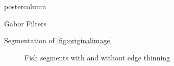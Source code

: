 \documentclass[final]{beamer}
\begin{document}
\begin{frame}
\begin{columns}
\begin{column}{.33\textwidth}
\begin{beamercolorbox}[center,wd=\textwidth]{postercolumn}
\begin{minipage}[T]{.95\textwidth}
{\begin{block}{Gabor Filters}
            \end{block}
            \vfill
            \begin{block}{Segmentation of \ref{fig:originalimage}}
             \begin{figure}
               \centering
               \caption{Fish segments with and without edge thinning}
               

\end{figure}
\end{block}}
\end{minipage}
\end{beamercolorbox}
\end{column}
\end{columns}
\end{frame}
\end{document}
